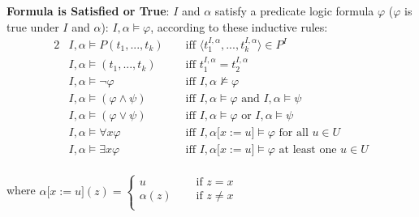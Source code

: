\textbf{Formula is Satisfied or True}: $I$ and $\alpha$ satisfy a predicate logic formula $\varphi$ ($\varphi$ is true under $I$ and $\alpha$): $I, \alpha \vDash \varphi$, according to these inductive rules: 
\vspace{-0.3cm}
\begin{alignat*}{2}
    &I,\alpha \vDash P(t_1,...,t_k) &&\text{ iff } \langle t_{1}^{I,\alpha},...,t_{k}^{I,\alpha}\rangle \in P^I\\ 
    &I,\alpha \vDash (t_1,...,t_k) &&\text{ iff } t_{1}^{I,\alpha} = t_{2}^{I,\alpha}\\ 
    &I,\alpha \vDash \neg\varphi &&\text{ iff } I,\alpha \nvDash \varphi\\
    &I,\alpha \vDash (\varphi \wedge \psi) &&\text{ iff } I,\alpha \vDash \varphi \text{ and } I,\alpha \vDash \psi\\ 
    &I,\alpha \vDash (\varphi \vee \psi) &&\text{ iff } I,\alpha \vDash \varphi \text{ or } I,\alpha \vDash \psi\\ 
    &I,\alpha \vDash \forall x\varphi &&\text{ iff } I,\alpha\lbrack x:=u\rbrack \vDash \varphi \text{ for all } u \in U\\ 
    &I,\alpha \vDash \exists x\varphi &&\text{ iff } I,\alpha\lbrack x:=u\rbrack \vDash \varphi \text{ at least one } u \in U
\end{alignat*} \vspace{-0.4cm} \\
where $ \alpha\lbrack x:=u\rbrack(z) = 
     \begin{cases}
       u &\quad\text{ if } z = x\\
       \alpha(z) &\quad\text{ if } z \neq x \\
     \end{cases}$ 
\\